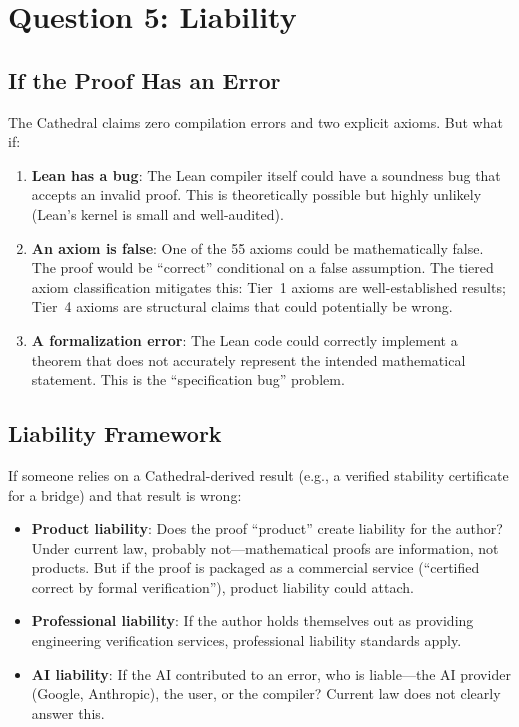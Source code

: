 \documentclass[11pt,a4paper]{article}
\begin{document}
\section{Question 5: Liability}
\label{sec:liability}

\subsection{If the Proof Has an Error}

The Cathedral claims zero compilation errors and two explicit
axioms. But what if:

\begin{enumerate}
  \item \textbf{Lean has a bug}: The Lean compiler itself could
    have a soundness bug that accepts an invalid proof. This is
    theoretically possible but highly unlikely (Lean's kernel is
    small and well-audited).

  \item \textbf{An axiom is false}: One of the 55 axioms could be
    mathematically false. The proof would be ``correct'' conditional
    on a false assumption. The tiered axiom classification mitigates
    this: Tier~1 axioms are well-established results; Tier~4 axioms
    are structural claims that could potentially be wrong.

  \item \textbf{A formalization error}: The Lean code could
    correctly implement a theorem that does not accurately represent
    the intended mathematical statement. This is the ``specification
    bug'' problem.
\end{enumerate}

\subsection{Liability Framework}

If someone relies on a Cathedral-derived result (e.g., a verified
stability certificate for a bridge) and that result is wrong:

\begin{itemize}
  \item \textbf{Product liability}: Does the proof ``product''
    create liability for the author? Under current law, probably
    not---mathematical proofs are information, not products. But
    if the proof is packaged as a commercial service (``certified
    correct by formal verification''), product liability could
    attach.

  \item \textbf{Professional liability}: If the author holds
    themselves out as providing engineering verification services,
    professional liability standards apply.

  \item \textbf{AI liability}: If the AI contributed to an error,
    who is liable---the AI provider (Google, Anthropic), the user,
    or the compiler? Current law does not clearly answer this.
\end{itemize}
\end{document}
